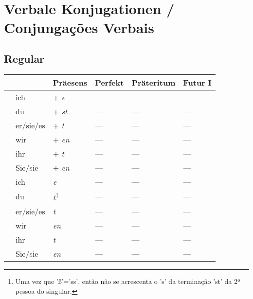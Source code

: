 \chapter{Verbale Konjugationen / Conjungações Verbais}\label{chapter:verben}

    \section{Regular}\label{section:verben:regular}

        \begin{longtabu}to 
            \toprule
            && \textbf{Präesens} & \textbf{Perfekt} & \textbf{Präteritum} & \textbf{Futur I}\\ \toprule \endhead
                & ich &  + \textit{e} & --- & --- & ---\\ \hline
                & du &  + \textit{st} & --- & --- & ---\\ \hline
                & er/sie/es &  + \textit{t} & --- & --- & ---\\ \hline
                & wir &  + \textit{en} & --- & --- & ---\\ \hline
                & ihr &  + \textit{t} & --- & --- & ---\\ \hline
                & Sie/sie &  + \textit{en} & --- & --- & ---\\ \hline
            \toprule
                 & ich & \textit{e} & --- & --- & ---\\ 
                & du & \textit{t}\footnote{Uma vez que 'ß'='ss', então não se acrescenta o 's' da terminação 'st' da 2ª pessoa do singular.} & --- & --- & ---\\ 
                & er/sie/es & \textit{t} & --- & --- & ---\\ 
                & wir & \textit{en} & --- & --- & ---\\ 
                & ihr & \textit{t} & --- & --- & ---\\ 
                & Sie/sie & \textit{en} & --- & --- & ---\\ 

\end{longtabu}
